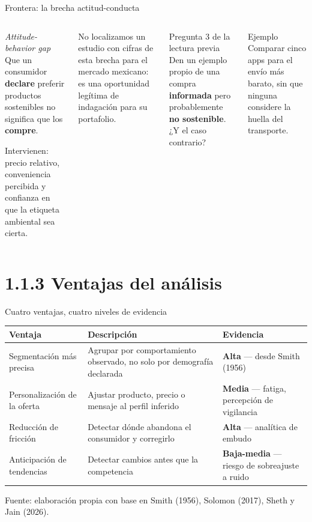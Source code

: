 \documentclass[aspectratio=169,xcolor=dvipsnames]{beamer}
\newcommand{\fuente}[1]{{\tiny\color{IPNgris}Fuente: #1}}
\begin{document}
\begin{frame}{Frontera: la brecha actitud-conducta}
\begin{columns}[T]
  \begin{alertblock}{\textit{Attitude-behavior gap}}
    Que un consumidor \textbf{declare} preferir productos sostenibles no significa que los \textbf{compre}.
    \vspace{4pt}

    \small Intervienen: precio relativo, conveniencia percibida y confianza en que la etiqueta ambiental sea cierta.
  \end{alertblock}
  {\small\color{IPNgris} No localizamos un estudio con cifras de esta brecha para el mercado mexicano: es una oportunidad legítima de indagación para su portafolio.}
  \begin{exampleblock}{Pregunta 3 de la lectura previa}
    \small Den un ejemplo propio de una compra \textbf{informada} pero probablemente \textbf{no sostenible}.\\[4pt]
    ¿Y el caso contrario?
  \end{exampleblock}
  \begin{block}{Ejemplo}
    \small Comparar cinco apps para el envío más barato, sin que ninguna considere la huella del transporte.
  \end{block}
\end{columns}
\end{frame}

\section[Ventajas]{1.1.3 Ventajas del análisis}

\begin{frame}{Cuatro ventajas, cuatro niveles de evidencia}
\small
\begin{center}
\begin{tabular}{@{}>{\raggedright}p{3.1cm}p{6.4cm}>{\raggedright\arraybackslash}p{3.6cm}@{}}
\toprule
\textbf{Ventaja} & \textbf{Descripción} & \textbf{Evidencia} \\
\midrule
Segmentación más precisa & Agrupar por comportamiento observado, no solo por demografía declarada & \textcolor{IPNguinda}{\textbf{Alta}} — desde Smith (1956) \\
Personalización de la oferta & Ajustar producto, precio o mensaje al perfil inferido & \textbf{Media} — fatiga, percepción de vigilancia \\
Reducción de fricción & Detectar dónde abandona el consumidor y corregirlo & \textcolor{IPNguinda}{\textbf{Alta}} — analítica de embudo \\
Anticipación de tendencias & Detectar cambios antes que la competencia & \textcolor{IPNterracota}{\textbf{Baja-media}} — riesgo de sobreajuste a ruido \\
\bottomrule
\end{tabular}
\end{center}
\fuente{elaboración propia con base en Smith (1956), Solomon (2017), Sheth y Jain (2026).}
\end{frame}
\end{document}

